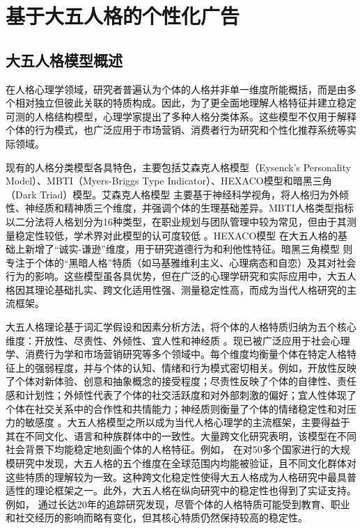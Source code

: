 \section{基于大五人格的个性化广告}

\subsection{大五人格模型概述}

在人格心理学领域，研究者普遍认为个体的人格并非单一维度所能概括，而是由多个相对独立但彼此关联的特质构成。因此，为了更全面地理解人格特征并建立稳定可测的人格结构模型，心理学家提出了多种人格分类体系。这些模型不仅用于解释个体的行为模式，也广泛应用于市场营销、消费者行为研究和个性化推荐系统等实际领域。

现有的人格分类模型各具特色，主要包括艾森克人格模型（Eysenck’s Personality Model）、MBTI（Myers-Briggs Type Indicator）、HEXACO模型和暗黑三角（Dark Triad）模型。艾森克人格模型 \citep{eysenck2017biological} 主要基于神经科学视角，将人格归为外倾性、神经质和精神质三个维度，并强调个体的生理基础差异。MBTI人格类型指标 \citep{briggs1976myers} 以二分法将人格划分为16种类型，在职业规划与团队管理中较为常见，但由于其测量稳定性较低，学术界对此模型的认可度较低 \citep{pittenger2005cautionary}。HEXACO模型 \citep{ashton2007empirical} 在大五人格的基础上新增了“诚实-谦逊”维度，用于研究道德行为和利他性特征。暗黑三角模型 \citep{paulhus2002dark} 则专注于个体的“黑暗人格”特质（如马基雅维利主义、心理病态和自恋）及其对社会行为的影响。这些模型虽各具优势，但在广泛的心理学研究和实际应用中，大五人格因其理论基础扎实、跨文化适用性强、测量稳定性高，而成为当代人格研究的主流框架。

大五人格理论基于词汇学假设和因素分析方法，将个体的人格特质归纳为五个核心维度：开放性、尽责性、外倾性、宜人性和神经质 \citep{mccrae1992introduction}。现已被广泛应用于社会心理学、消费行为学和市场营销研究等多个领域中。每个维度均衡量个体在特定人格特征上的强弱程度，并与个体的认知、情绪和行为模式密切相关。例如，开放性反映了个体对新体验、创意和抽象概念的接受程度；尽责性反映了个体的自律性、责任感和计划性；外倾性代表了个体的社交活跃度和对外部刺激的偏好；宜人性体现了个体在社交关系中的合作性和共情能力；神经质则衡量了个体的情绪稳定性和对压力的敏感度 \citep{costa1995domains}。大五人格模型之所以成为当代人格心理学的主流框架，主要得益于其在不同文化、语言和种族群体中的一致性。大量跨文化研究表明，该模型在不同社会背景下均能稳定地刻画个体的人格特征。例如，\citet{mccrae2002nature} 在对50多个国家进行的大规模研究中发现，大五人格的五个维度在全球范围内均能被验证，且不同文化群体对这些特质的理解较为一致。这种跨文化稳定性使得大五人格成为人格研究中最具普适性的理论框架之一。此外，大五人格在纵向研究中的稳定性也得到了实证支持。例如，\citet{caspi2005personality} 通过长达20年的追踪研究发现，尽管个体的人格特质可能受到教育、职业和社交经历的影响而略有变化，但其核心特质仍然保持较高的稳定性。

